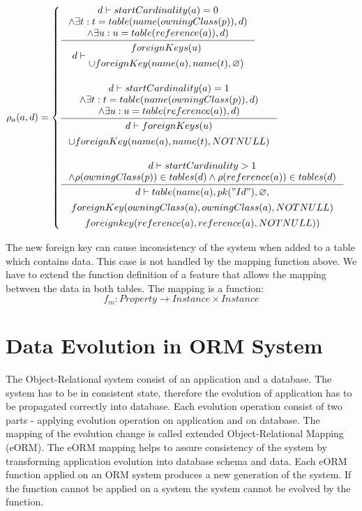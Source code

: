 \documentclass[11pt]{article}
\begin{document}
$
\rho_a(a,d) = \begin{cases}
 \inference{d \vdash startCardinality(a) = 0 \\ \wedge \exists t : t = table(name(owningClass(p)), d) \\ \wedge \exists u : u = table(reference(a)), d)}{d \vdash 
 \begin{gathered}
 foreignKeys(u) \\ \cup foreignKey(name(a), name(t),  \varnothing) 
 \end{gathered}
 }
  \\ \\
 \inference{d \vdash startCardinality(a) = 1 \\\\ \wedge \exists t : t = table(name(owningClass(p)), d) \\ \wedge \exists u : u = table(reference(a)), d)}{\begin{gathered} d \vdash 
foreignKeys(u) \\ \cup  foreignKey(name(a), name(t),  NOTNULL)
\end{gathered}
} \\ \\
 
  \inference{d \vdash  startCardinality > 1 \\ \wedge \rho(owningClass(p)) \in tables(d) \wedge \rho(reference(a)) \in tables(d)}{
  \begin{gathered} d \vdash 
 table(name(a), pk("Id"), \varnothing, \\ foreignKey(owningClass(a),owningClass(a), NOTNULL) \\ foreignkey(reference(a), reference(a), NOTNULL)) 
  \end{gathered}}  
 \end{cases}
$

The new foreign key can cause inconsistency of the system when added to a table which contains data. This case is not handled by the mapping function above. We have to extend the function definition of a feature that allows the mapping between the data in both tables. The mapping is a function:
$$f_m : Property \rightarrow Instance \times Instance $$




\section{Data Evolution in ORM System}
The Object-Relational system consist of an application and a database. The system has to be in consistent state, therefore the evolution of application has to be propagated correctly into database. Each evolution operation consist of two parts - applying evolution operation on application and on database. The mapping of the evolution change is called extended Object-Relational Mapping (eORM). The eORM mapping helps to assure consistency of the system by transforming application evolution into database schema and data. Each eORM function applied on an ORM system produces a new generation of the system. If the function cannot be applied on a system the system cannot be evolved by the function. 
\end{document}
